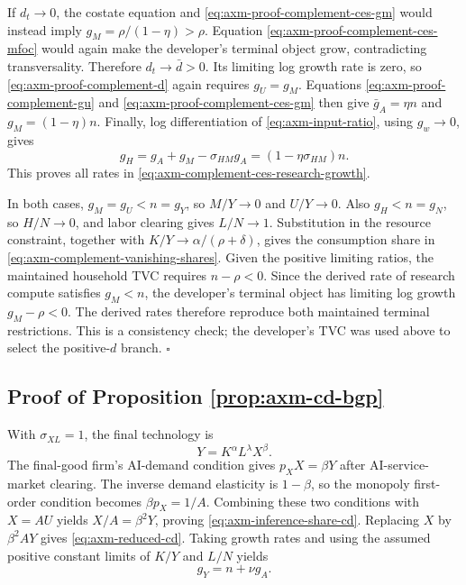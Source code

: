 If \(d_t\to0\), the costate equation and
\eqref{eq:axm-proof-complement-ces-gm} would instead imply
\(g_M=\rho/(1-\eta)>\rho\). Equation
\eqref{eq:axm-proof-complement-ces-mfoc} would again make the developer's
terminal object grow, contradicting transversality. Therefore
\(d_t\to\bar d>0\). Its limiting log growth rate is zero, so
\eqref{eq:axm-proof-complement-d} again requires \(g_U=g_M\). Equations
\eqref{eq:axm-proof-complement-gu} and
\eqref{eq:axm-proof-complement-ces-gm} then give
\(\bar g_A=\eta n\) and \(g_M=(1-\eta)n\). Finally, log differentiation of
\eqref{eq:axm-input-ratio}, using \(g_w\to0\), gives
\[
 g_H=g_A+g_M-\sigma_{HM}g_A=(1-\eta\sigma_{HM})n.
\]
This proves all rates in \eqref{eq:axm-complement-ces-research-growth}.

In both cases, \(g_M=g_U<n=g_Y\), so \(M/Y\to0\) and \(U/Y\to0\). Also
\(g_H<n=g_N\), so \(H/N\to0\), and labor clearing gives \(L/N\to1\).
Substitution in the resource constraint, together with
\(K/Y\to\alpha/(\rho+\delta)\), gives the consumption share in
\eqref{eq:axm-complement-vanishing-shares}. Given the positive limiting ratios,
the maintained household TVC requires \(n-\rho<0\). Since the derived rate of
research compute satisfies \(g_M<n\), the developer's terminal object has
limiting log growth \(g_M-\rho<0\). The derived rates therefore reproduce both
maintained terminal restrictions. This is a consistency check; the developer's
TVC was used above to select the positive-\(d\) branch. \(\square\)

\subsection{Proof of Proposition \ref{prop:axm-cd-bgp}}

With \(\sigma_{XL}=1\), the final technology is
\[
 Y=K^\alpha L^\lambda X^\beta.
\]
The final-good firm's AI-demand condition gives \(p_XX=\beta Y\) after
AI-service-market clearing. The inverse demand elasticity is \(1-\beta\), so the
monopoly first-order condition becomes \(\beta p_X=1/A\). Combining these two
conditions with \(X=AU\) yields
\(X/A=\beta^2Y\), proving \eqref{eq:axm-inference-share-cd}. Replacing
\(X\) by \(\beta^2AY\) gives \eqref{eq:axm-reduced-cd}. Taking growth rates
and using the assumed positive constant limits of \(K/Y\) and \(L/N\) yields
\[
 g_Y=n+\nu g_A.
\]

